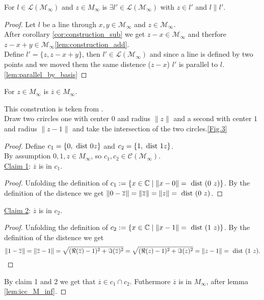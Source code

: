 \begin{corollary}
    \label{lem:construction_parallel_lines}
    \leanok
    For $l \in \mathcal{L(M_{\infty})}$ and $z \in M_{\infty}$ is $\exists l' \in \mathcal{L(M_{\infty})}$ with  $z\in l'$  and  $l\|l'$.
\end{corollary}
\begin{proof}
    Let $l$ be a line through $x,y \in \mathcal{M_{\infty}}$ and $z \in \mathcal{M_{\infty}}$.\\
    After corollary \ref{cor:construction_sub} we get $z - x \in \mathcal{M_{\infty}}$ and therfore $z-x + y \in \mathcal{M_{\infty}}$\ref{lem:construction_add}.\\
    Define $l' = \{z, z-x+y\}$, then $l' \in \mathcal{L(M_{\infty})}$ and since a line is defined by two points and we moved them the same distence ($z-x$) $l'$ is parallel to $l$.\ref{lem:parallel_by_basis}
\end{proof}
\begin{lemma}
    \label{lem:construction_conj}
    \leanok
    For $z \in M_{\infty}$ is $\overline{z} \in M_{\infty}$.
\end{lemma}
This constrution is teken from \cite{JAN_SCHRÖER:2023}.\\
Draw two crircles one with center $0$ and radius $\|z\|$ and a second with center $1$ and radius $\|z-1\|$ and take the intersection of the two circles.\ref{Fig.3}
\begin{proof}
    Define $c_1 = \{0,\text{ dist } 0 z\}$ and $c_2 = \{1,\text{ dist } 1 z\}$.\\
    By assumption $0, 1, z \in M_{\infty}$, so $c_1, c_2 \in \mathcal{C(M_{\infty})}$.\\
    \underline{Claim 1}: $\overline{z}$ is in $c_1$.
    \begin{proof}
        Unfolding the definition of $c_1:=\{x\in\mathbb{C} \mid\|x-0\|=\dist (0\ z)\}$.
        By the definition of the distence we get $\|0-\overline{z}\| = \|\overline{z}\| =\|z\| = \text{ dist } (0\ z)$.
    \end{proof}
    \underline{Claim 2}: $\overline{z}$ is in $c_2$.
    \begin{proof}
        Unfolding the definition of $c_2:=\{x\in\mathbb{C} \mid\|x-1\|=\dist (1\ z)\}$.
        By the definition of the distence we get $$\|1-\overline{z}\| = \|\overline{z}-1\| = \sqrt{(\Re(\overline{z})-1)^2 + \Im(\overline{z})^2} = \sqrt{(\Re(z)-1)^2 + \Im(z)^2} = \|z-1\|=\text{ dist } (1\ z).$$
    \end{proof}
    By claim 1 and 2 we get that $\overline{z} \in c_1 \cap c_2$. Futhermore  $\overline{z} $ is in $M_{\infty}$, after lemma \ref{lem:icc_M_inf}.
\end{proof}
